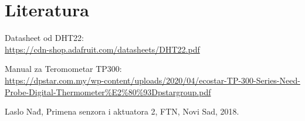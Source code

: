 \documentclass[a4paper, 12pt]{article}
\begin{document}
%
%
%
%
%
%
%
%
%
\pagebreak
\endgroup

\begingroup
\sloppy

\section{Literatura}

\vspace{10pt}

\begin{enumerate}[label={[\arabic*]}, leftmargin=2.5cm]
	\item Datasheet od DHT22: \label{lib:DHT22-datasheet}\\ \url{https://cdn-shop.adafruit.com/datasheets/DHT22.pdf}
	\sloppypar
	\item Manual za Teromometar TP300: \label{lib:TP300}\\ \url{https://dpstar.com.my/wp-content/uploads/2020/04/ecostar-TP-300-Series-Need-Probe-Digital-Thermometer\%E2\%80\%93Dpstargroup.pdf}	
	\item Laslo Nađ, Primena senzora i aktuatora 2, FTN, Novi Sad, 2018.
\end{enumerate}
\renewcommand{\theenumi}{\arabic{enumi}}

\pagebreak
\endgroup
\end{document}
